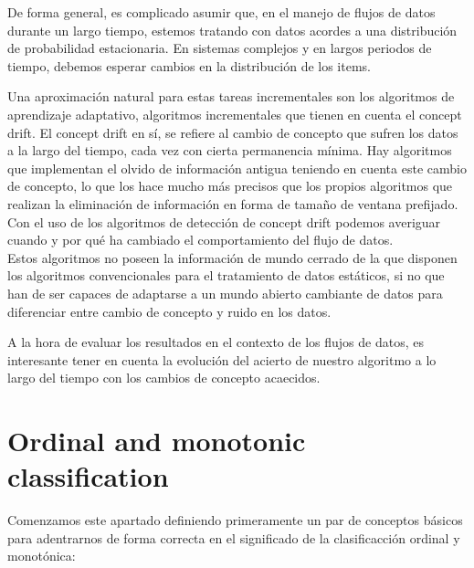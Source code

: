 De forma general, es complicado asumir que, en el manejo de flujos de datos durante un largo tiempo, estemos tratando con datos acordes a una distribución de probabilidad
estacionaria. En sistemas complejos y en largos periodos de tiempo, debemos esperar cambios en la distribución de los items.

Una aproximación natural para estas tareas incrementales son los algoritmos de aprendizaje adaptativo, algoritmos incrementales que tienen en cuenta el concept drift.
El concept drift en sí, se refiere al cambio de concepto que sufren los datos a la largo del tiempo, cada vez con cierta permanencia mínima.
Hay algoritmos que implementan el olvido de información antigua teniendo en cuenta este cambio de concepto, lo que los hace mucho más precisos que los propios algoritmos
que realizan la eliminación de información en forma de tamaño de ventana prefijado.\\
Con el uso de los algoritmos de detección de concept drift podemos averiguar cuando y por qué ha cambiado el comportamiento del flujo de datos.\\
Estos algoritmos no poseen la información de mundo cerrado de la que disponen los algoritmos convencionales para el tratamiento de datos estáticos, si no que han de ser
capaces de adaptarse a un mundo abierto cambiante de datos para diferenciar entre cambio de concepto y ruido en los datos.

A la hora de evaluar los resultados en el contexto de los flujos de datos, es interesante tener en cuenta la evolución del acierto de nuestro algoritmo a lo largo del tiempo
con los cambios de concepto acaecidos.





















\section{Ordinal and monotonic classification}

Comenzamos este apartado definiendo primeramente un par de conceptos básicos para adentrarnos de forma correcta en el significado
de la clasificacción ordinal y monotónica:

